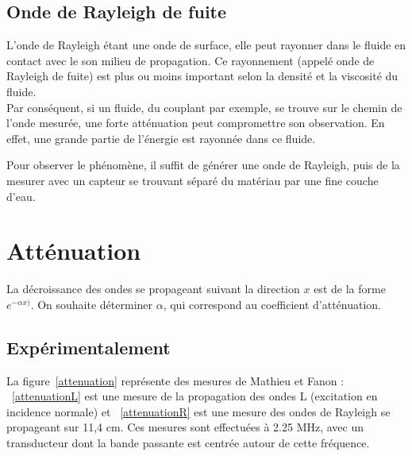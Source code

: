 \documentclass[twoside]{article}
\begin{document}
\begin{multicols}{2}
\subsection{Onde de Rayleigh de fuite}

L'onde de Rayleigh étant une onde de surface, elle peut rayonner dans le fluide en contact avec le son milieu de propagation. Ce rayonnement (appelé onde de Rayleigh de fuite) est plus ou moins important selon la densité et la viscosité du fluide. \\

Par conséquent, si un fluide, du couplant par exemple, se trouve sur le chemin de l'onde mesurée, une forte atténuation peut compromettre son observation. En effet, une grande partie de l'énergie est rayonnée dans ce fluide.

Pour observer le phénomène, il suffit de générer une onde de Rayleigh, puis de la mesurer avec un capteur se trouvant séparé du matériau par une fine couche d'eau. 


\section{Atténuation}
La décroissance des ondes se propageant suivant la direction $x$ est de la forme $e^{-\alpha x)}$. On souhaite déterminer $\alpha$, qui correspond au coefficient d'atténuation.

\subsection{Expérimentalement}
La figure~\ref{attenuation} représente des mesures de Mathieu et Fanon : ~\ref{attenuationL} est une mesure de la propagation des ondes L (excitation en incidence normale) et ~\ref{attenuationR} est une mesure des ondes de Rayleigh se propageant sur 11,4 cm. Ces mesures sont effectuées à 2.25 MHz, avec un transducteur dont la bande passante est centrée autour de cette fréquence.



\end{multicols}
\end{document}
